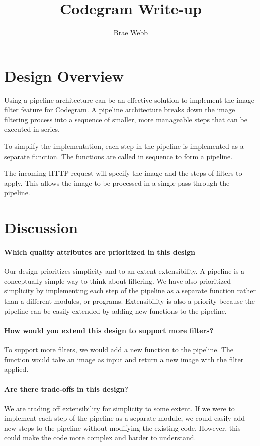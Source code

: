 \documentclass{csse4400}
\title{Codegram Write-up}
\author{Brae Webb}
\date{\week{2}}
\begin{document}
\maketitle

\section{Design Overview}

Using a pipeline architecture can be an effective solution to implement the image filter feature for Codegram.
A pipeline architecture breaks down the image filtering process into a sequence of smaller,
more manageable steps that can be executed in series.

To simplify the implementation,
each step in the pipeline is implemented as a separate function.
The functions are called in sequence to form a pipeline.

The incoming HTTP request will specify the image and the steps of filters to apply.
This allows the image to be processed in a single pass through the pipeline.

\section{Discussion}

\paragraph{Which quality attributes are prioritized in this design}
Our design prioritizes simplicity and to an extent extensibility.
A pipeline is a conceptually simple way to think about filtering.
We have also prioritized simplicity by implementing each step of the pipeline as a separate function rather than a different modules, or programs.
Extensibility is also a priority because the pipeline can be easily extended by adding new functions to the pipeline.

\paragraph{How would you extend this design to support more filters?}
To support more filters, we would add a new function to the pipeline.
The function would take an image as input and return a new image with the filter applied.

\paragraph{Are there trade-offs in this design?}
We are trading off extensibility for simplicity to some extent.
If we were to implement each step of the pipeline as a separate module, we could easily add new steps to the pipeline without modifying the existing code.
However, this could make the code more complex and harder to understand.
\end{document}
